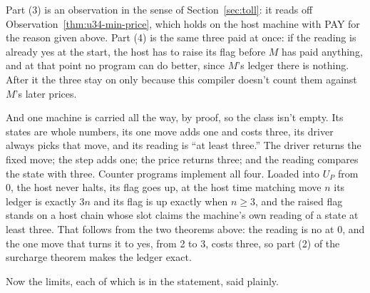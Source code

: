 \documentclass[11pt,twoside]{article}
\theoremstyle{thielethm}
\theoremstyle{thieledef}
\theoremstyle{thieledef}
\theoremstyle{thieledef}
\theoremstyle{thielethm}
\theoremstyle{thieleobs}
\theoremstyle{thielethm}
\begin{document}
Part (3) is an
observation in the sense of Section~\ref{sec:toll}: it reads off
Observation~\ref{thm:u34-min-price}, which holds on the host machine with PAY for the reason given
above. Part (4) is the same three paid at once: if the reading is
already yes at the start, the host has to raise its flag before $M$ has paid anything, and at that point no program can do better, since $M$'s ledger there is nothing. After it the three stay on only because this compiler doesn't count them against $M$'s later prices.

And one machine is carried all the way, by proof, so the class isn't empty. Its states are whole numbers, its one
move adds one and costs three, its driver always picks that move, and its reading is ``at least
three.'' The driver returns the fixed move; the step adds one; the price returns three; and the
reading compares the state with three. Counter programs implement all four. Loaded into $U_P$ from 0, the host never halts, its flag goes up, at the host
time matching move $n$ its ledger is exactly $3n$ and its flag is up exactly when $n \ge 3$, and
the raised flag stands on a host chain whose slot claims the machine's own reading of a state at
least three. That follows from the two theorems above: the reading is no at 0, and the one move
that turns it to yes, from 2 to 3, costs three, so part (2) of the surcharge theorem makes the
ledger exact.

Now the limits, each of which is in the statement, said plainly.
\end{document}
